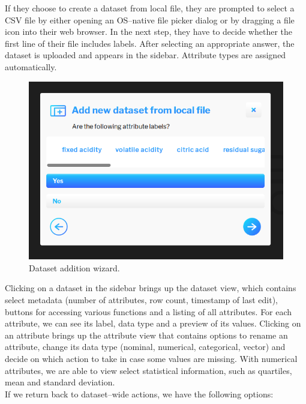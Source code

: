 \documentclass{article}
\begin{document}
\newpage

If they choose to create a dataset from local file, they are prompted to select a CSV file by either opening an OS--native file picker dialog or by dragging a file icon into their web browser. In the next step, they have to decide whether the first line of their file includes labels. After selecting an appropriate answer, the dataset is uploaded and appears in the sidebar. Attribute types are assigned automatically.\\

\newpage

\begin{figure}[!h]
\centering
\includegraphics[scale=0.35]{images/manager_labels}
\caption{Dataset addition wizard.}
\label{fig:managerlabels}
\end{figure}

Clicking on a dataset in the sidebar brings up the dataset view, which contains select metadata (number of attributes, row count, timestamp of last edit), buttons for accessing various functions and a listing of all attributes. For each attribute, we can see its label, data type and a preview of its values. Clicking on an attribute brings up the attribute view that contains options to rename an attribute, change its data type (nominal, numerical, categorical, vector) and decide on which action to take in case some values are missing. With numerical attributes, we are able to view select statistical information, such as quartiles, mean and standard deviation.\\

If we return back to dataset--wide actions, we have the following options:
\end{document}
